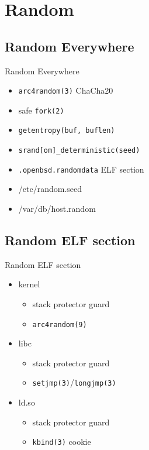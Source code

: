 \documentclass[14pt]{beamer}
\begin{document}
\section{Random}

\subsection{Random Everywhere}
\begin{frame}{Random Everywhere}
\begin{itemize}
    \item \texttt{arc4random(3)} ChaCha20
    \item safe \texttt{fork(2)}
    \item \texttt{getentropy(buf, buflen)}
    \item \texttt{srand[om]\_deterministic(seed)}
    \item \texttt{.openbsd.randomdata} ELF section
    \item /etc/random.seed
    \item /var/db/host.random
\end{itemize}
\end{frame}

\subsection{Random ELF section}
\begin{frame}{Random ELF section}
\begin{itemize}
    \item kernel
    \begin{itemize}
	\item stack protector guard
	\item \texttt{arc4random(9)}
    \end{itemize}
    \item libc
    \begin{itemize}
	\item stack protector guard
	\item \texttt{setjmp(3)}/\texttt{longjmp(3)}
    \end{itemize}
    \item ld.so
    \begin{itemize}
	\item stack protector guard
	\item \texttt{kbind(3)} cookie
    \end{itemize}
\end{itemize}
\end{frame}
\end{document}
